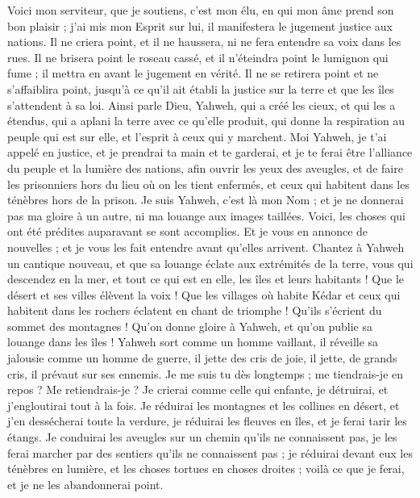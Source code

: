 \begin{multicols}{2}
\VerseOne{}Voici mon serviteur, que je soutiens, c'est mon élu, en qui mon âme prend son bon plaisir ; j'ai mis mon Esprit sur lui, il manifestera le jugement justice aux nations.
Il ne criera point, et il ne haussera, ni ne fera entendre sa voix dans les rues.
Il ne brisera point le roseau cassé, et il n'éteindra point le lumignon qui fume ; il mettra en avant le jugement en vérité.
Il ne se retirera point et ne s'affaiblira point, jusqu'à ce qu'il ait établi la justice sur la terre et que les îles s'attendent à sa loi.
Ainsi parle Dieu, Yahweh, qui a créé les cieux, et qui les a étendus, qui a aplani la terre avec ce qu'elle produit, qui donne la respiration au peuple qui est sur elle, et l'esprit à ceux qui y marchent.
Moi Yahweh, je t'ai appelé en justice, et je prendrai ta main et te garderai, et je te ferai être l'alliance du peuple et la lumière des nations,
afin ouvrir les yeux des aveugles, et de faire les prisonniers hors du lieu où on les tient enfermés, et ceux qui habitent dans les ténèbres hors de la prison.
Je suis Yahweh, c'est là mon Nom ; et je ne donnerai pas ma gloire à un autre, ni ma louange aux images taillées.
Voici, les choses qui ont été prédites auparavant se sont accomplies. Et je vous en annonce de nouvelles ; et je vous les fait entendre avant qu'elles arrivent.
Chantez à Yahweh un cantique nouveau, et que sa louange éclate aux extrémités de la terre, vous qui descendez en la mer, et tout ce qui est en elle,  les îles et leurs habitants !
Que le désert et ses villes élèvent la voix ! Que les villages où habite Kédar et ceux qui habitent dans les rochers éclatent en chant de triomphe ! Qu'ils s'écrient du sommet des montagnes !
Qu'on donne gloire à Yahweh, et qu'on publie sa louange dans les îles !
Yahweh sort comme un homme vaillant, il réveille sa jalousie comme un homme de guerre, il jette des cris de joie, il jette, de grands cris, il prévaut sur ses ennemis.
Je me suis tu dès longtemps ; me tiendrais-je en repos ? Me retiendrais-je ? Je crierai comme celle qui enfante, je détruirai, et j'engloutirai tout à la fois.
Je réduirai les montagnes et les collines en désert, et j'en dessécherai toute la verdure, je réduirai les fleuves en îles, et je ferai tarir les étangs.
Je conduirai les aveugles sur un chemin qu'ils ne connaissent pas, je les ferai marcher par des sentiers qu'ils ne connaissent pas ; je réduirai devant eux les ténèbres en lumière, et les choses tortues en choses droites ; voilà ce que je ferai, et je ne les abandonnerai point.

\end{multicols}
